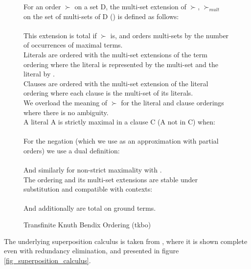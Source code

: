 \begin{figure}
\noindent
For an order $\succ$ on a set D, the multi-set extension of $\succ$, $\succ_{mult}$ on the set of multi-sets of D () is defined as follows:\\
\\
This extension is total if $\succ$ is, and orders multi-sets by the number of occurrences of maximal terms.\\
Literals are ordered with the multi-set extensions of the term ordering where the literal  is represented by the multi-set  and the literal  by .\\
Clauses are ordered with the multi-set extension of the literal ordering where each clause is the multi-set of its literals.\\
We overload the meaning of $\succ$ for the literal and clause orderings where there is no ambiguity.\\
A literal A is strictly maximal in a clause C (A not in C) when:\\
\\
For the negation (which we use as an approximation with partial orders) we use a dual definition:\\
\\
And similarly for non-strict maximality with .\\
The ordering and its multi-set extensions are stable under substitution and compatible with contexts:\\
\\
And additionally are total on ground terms.

\caption{Transfinite Knuth Bendix Ordering (tkbo)}
\label{fig_tkbo}
\end{figure}


The underlying superposition calculus is taken from \cite{BachmairGanzingerSuperposition}, where it is shown complete even with redundancy elimination, and presented in figure \ref{fig_superposition_calculus}.

